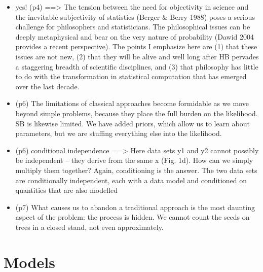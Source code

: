 \documentclass[twoside]{article}	                         %
\begin{document}
\begin{itemize}
  \item yes! (p4) ==> The tension between the need for objectivity in science and the inevitable subjectivity of statistics (Berger & Berry 1988) poses a serious challenge for philosophers and statisticians. The philosophical issues can be deeply metaphysical and bear on the very nature of probability (Dawid 2004 provides a recent perspective). The points I emphasize here are (1) that these issues are not new, (2) that they will be alive and well long after HB pervades a staggering breadth of scientific disciplines, and (3) that philosophy has little to do with the transformation in statistical computation that has emerged over the last decade. 
  \item (p6) The limitations of classical approaches become formidable as we move beyond simple problems, because they place the full burden on the likelihood. SB is likewise limited. We have added priors, which allow us to learn about parameters, but we are stuffing everything else into the likelihood.
  \item (p6) conditional independence ==> Here data sets y1 and y2 cannot possibly be independent – they derive from the same x (Fig. 1d). How can we simply multiply them together? Again, conditioning is the answer. The two data sets are conditionally independent, each with a data model and conditioned on quantities that are also modelled
  \item (p7) What causes us to abandon a traditional approach is the most daunting aspect of the problem: the process is hidden. We cannot count the seeds on trees in a closed stand, not even approximately.
\end{itemize}



\section{Models}
\end{document}
